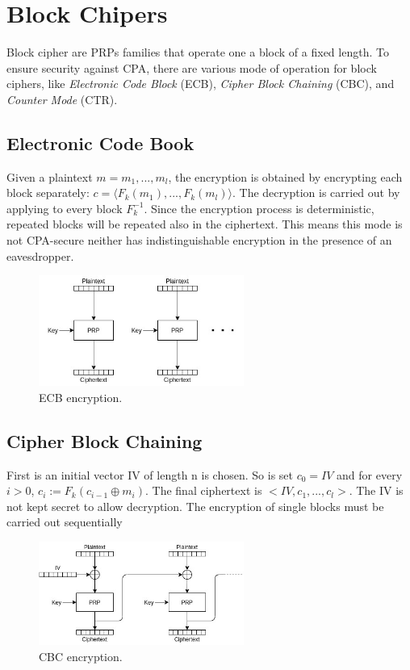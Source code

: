 \section{Block Chipers}
Block cipher are PRPs families that operate one a block of a fixed length. To ensure security against CPA, there are various mode of operation for block ciphers, like \emph{Electronic Code Block} (ECB), \emph{Cipher Block Chaining} (CBC), and \emph{Counter Mode} (CTR).

\subsection{Electronic Code Book}
Given a plaintext $m = m_1,...,m_l$, the encryption is obtained by encrypting each block separately: $c = \langle F_k(m_1),...,F_k(m_l) \rangle$.
The decryption is carried out by applying to every block $F_k^{-1}$. Since the encryption process is deterministic, repeated blocks will be repeated also in the ciphertext. This means this mode is not CPA-secure neither has indistinguishable encryption in the presence of an eavesdropper.
\begin{figure}[H]
    \centering
    \includegraphics[width=0.6\textwidth]{img/private-key/ecb.jpg}
    \caption{ECB encryption.}
\end{figure}

\subsection{Cipher Block Chaining}
First is an initial vector IV of length n is chosen. So is set $c_0 = IV$ and for every $i > 0$, $c_i := F_k(c_{i-1} \oplus m_i)$. The final ciphertext is $<IV,c_1,...,c_l>$. The IV is not kept secret to allow decryption. The encryption of single blocks must be carried out sequentially
\begin{figure}[H]
    \centering
    \includegraphics[width=0.6\textwidth]{img/private-key/cbc.jpg}
    \caption{CBC encryption.}
\end{figure}

